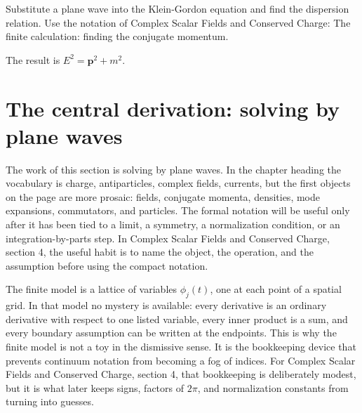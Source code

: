 \begin{exercise}
Substitute a plane wave into the Klein-Gordon equation and find the dispersion relation.  Use the notation of Complex Scalar Fields and Conserved Charge: The finite calculation: finding the conjugate momentum.
\begin{answer}
The result is \(E^2=\bm p^2+m^2\).
\end{answer}
\end{exercise}



\section{The central derivation: solving by plane waves}













The work of this section is solving by plane waves.  In the chapter heading the vocabulary is charge, antiparticles, complex fields, currents, but the first objects on the page are more prosaic: fields, conjugate momenta, densities, mode expansions, commutators, and particles.  The formal notation will be useful only after it has been tied to a limit, a symmetry, a normalization condition, or an integration-by-parts step.  In Complex Scalar Fields and Conserved Charge, section 4, the useful habit is to name the object, the operation, and the assumption before using the compact notation.

The finite model is a lattice of variables \(\phi_j(t)\), one at each point of a spatial grid.  In that model no mystery is available: every derivative is an ordinary derivative with respect to one listed variable, every inner product is a sum, and every boundary assumption can be written at the endpoints.  This is why the finite model is not a toy in the dismissive sense.  It is the bookkeeping device that prevents continuum notation from becoming a fog of indices.  For Complex Scalar Fields and Conserved Charge, section 4, that bookkeeping is deliberately modest, but it is what later keeps signs, factors of \(2\pi\), and normalization constants from turning into guesses.

